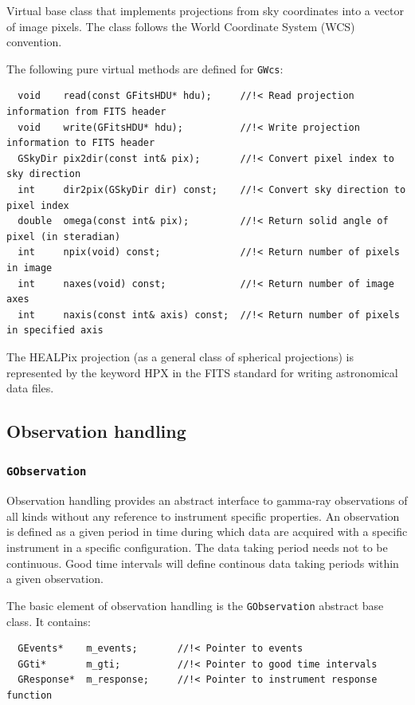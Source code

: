 \documentclass{article}[12pt,a4]
\begin{document}
Virtual base class that implements projections from sky coordinates into a vector of
image pixels.
The class follows the World Coordinate System (WCS) convention.

The following pure virtual methods are defined for {\tt GWcs}:
\begin{verbatim}
  void    read(const GFitsHDU* hdu);     //!< Read projection information from FITS header
  void    write(GFitsHDU* hdu);          //!< Write projection information to FITS header
  GSkyDir pix2dir(const int& pix);       //!< Convert pixel index to sky direction
  int     dir2pix(GSkyDir dir) const;    //!< Convert sky direction to pixel index
  double  omega(const int& pix);         //!< Return solid angle of pixel (in steradian)
  int     npix(void) const;              //!< Return number of pixels in image
  int     naxes(void) const;             //!< Return number of image axes
  int     naxis(const int& axis) const;  //!< Return number of pixels in specified axis
\end{verbatim}

The HEALPix projection (as a general class of spherical projections) is represented by the 
keyword HPX in the FITS standard for writing astronomical data files.


\subsection{Observation handling}

\subsubsection{{\tt GObservation}}

Observation handling provides an abstract interface to gamma-ray observations of all kinds
without any reference to instrument specific properties.
An observation is defined as a given period in time during which data are acquired with a
specific instrument in a specific configuration.
The data taking period needs not to be continuous.
Good time intervals will define continous data taking periods within a given observation.

The basic element of observation handling is the {\tt GObservation} abstract base class.
It contains:
\begin{verbatim}
  GEvents*    m_events;       //!< Pointer to events
  GGti*       m_gti;          //!< Pointer to good time intervals
  GResponse*  m_response;     //!< Pointer to instrument response function
\end{verbatim}
\end{document}
